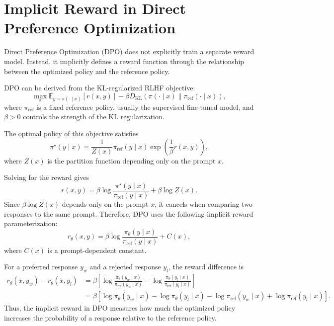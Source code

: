 \section{Implicit Reward in Direct Preference Optimization}

Direct Preference Optimization (DPO) does not explicitly train a separate reward model. Instead, it implicitly defines a reward function through the relationship between the optimized policy and the reference policy.

DPO can be derived from the KL-regularized RLHF objective:
\[
    \max_{\pi}
    \mathbb{E}_{y\sim \pi(\cdot\mid x)}
    \left[
        r(x,y)
    \right]
    -
    \beta
    D_{\mathrm{KL}}
    \left(
        \pi(\cdot\mid x)
        \middle\|
        \pi_{\mathrm{ref}}(\cdot\mid x)
    \right),
\]
where $\pi_{\mathrm{ref}}$ is a fixed reference policy, usually the supervised fine-tuned model, and $\beta>0$ controls the strength of the KL regularization.

The optimal policy of this objective satisfies
\[
    \pi^\star(y\mid x)
    =
    \frac{1}{Z(x)}
    \pi_{\mathrm{ref}}(y\mid x)
    \exp
    \left(
        \frac{1}{\beta} r(x,y)
    \right),
\]
where $Z(x)$ is the partition function depending only on the prompt $x$.

Solving for the reward gives
\[
    r(x,y)
    =
    \beta
    \log
    \frac{
        \pi^\star(y\mid x)
    }{
        \pi_{\mathrm{ref}}(y\mid x)
    }
    +
    \beta \log Z(x).
\]
Since $\beta\log Z(x)$ depends only on the prompt $x$, it cancels when comparing two responses to the same prompt. Therefore, DPO uses the following implicit reward parameterization:
\[
    r_\theta(x,y)
    =
    \beta
    \log
    \frac{
        \pi_\theta(y\mid x)
    }{
        \pi_{\mathrm{ref}}(y\mid x)
    }
    +
    C(x),
\]
where $C(x)$ is a prompt-dependent constant.

For a preferred response $y_w$ and a rejected response $y_l$, the reward difference is
\[
\begin{aligned}
    r_\theta(x,y_w)-r_\theta(x,y_l)
    &=
    \beta
    \left[
        \log
        \frac{
            \pi_\theta(y_w\mid x)
        }{
            \pi_{\mathrm{ref}}(y_w\mid x)
        }
        -
        \log
        \frac{
            \pi_\theta(y_l\mid x)
        }{
            \pi_{\mathrm{ref}}(y_l\mid x)
        }
    \right] \\
    &=
    \beta
    \left[
        \log \pi_\theta(y_w\mid x)
        -
        \log \pi_\theta(y_l\mid x)
        -
        \log \pi_{\mathrm{ref}}(y_w\mid x)
        +
        \log \pi_{\mathrm{ref}}(y_l\mid x)
    \right].
\end{aligned}
\]
Thus, the implicit reward in DPO measures how much the optimized policy increases the probability of a response relative to the reference policy.

